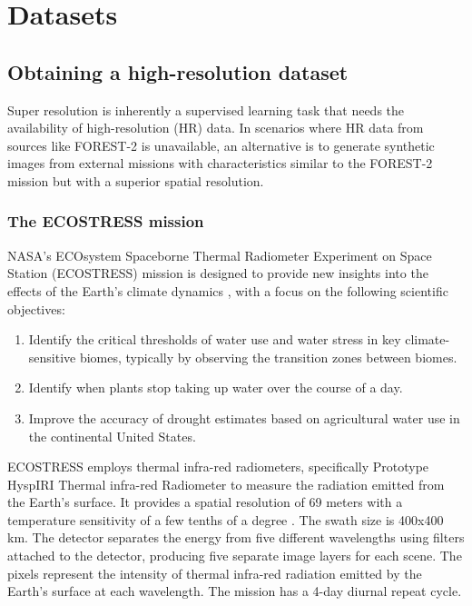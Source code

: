 \section{Datasets}

\subsection{Obtaining a high-resolution dataset}
    
    
Super resolution is inherently a supervised learning task that needs the availability of high-resolution (HR) data. In scenarios where HR data from sources like FOREST-2 is unavailable, an alternative is to generate synthetic images from external missions with characteristics similar to the FOREST-2 mission but with a superior spatial resolution.

\subsubsection{The ECOSTRESS mission}

NASA's ECOsystem Spaceborne Thermal Radiometer Experiment on Space Station (ECOSTRESS) mission is designed to provide new insights into the effects of the Earth's climate dynamics \cite{ECOSTRESS2023}, with a focus on the following scientific objectives:

\begin{enumerate}
    \item Identify the critical thresholds of water use and water stress in key climate-sensitive biomes, typically by observing the transition zones between biomes.
    \item Identify when plants stop taking up water over the course of a day.
    \item Improve the accuracy of drought estimates based on agricultural water use in the continental United States. 
\end{enumerate}

ECOSTRESS employs thermal infra-red radiometers, specifically Prototype HyspIRI Thermal infra-red Radiometer \cite{PhyTIR2023} to measure the radiation emitted from the Earth's surface. It provides a spatial resolution of 69 meters with a temperature sensitivity of a few tenths of a degree \cite{ECOSTRESS2023}. The swath size is 400x400 km. The detector separates the energy from five different wavelengths using filters attached to the detector, producing five separate image layers for each scene. The pixels represent the intensity of thermal infra-red radiation emitted by the Earth's surface at each wavelength. The mission has a 4-day diurnal repeat cycle.

